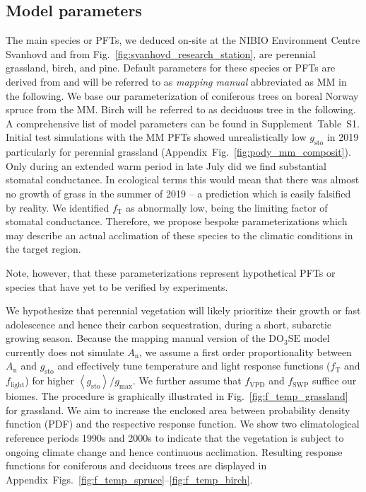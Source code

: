 \documentclass[bg, manuscript]{copernicus}
\begin{document}
\subsection{Model parameters}
\label{subsec:do3se_parameters}

The main species or PFTs, we deduced on-site at the NIBIO Environment Centre Svanhovd and from Fig.~\ref{fig:svanhovd_research_station}, are perennial grassland, birch, and pine. Default parameters for these species or PFTs are derived from \citet{EP:Simpson2007,GCB:Mills2011,ICP:MappingManual2017} and will be referred to as \emph{mapping manual} abbreviated as MM in the following. We base our parameterization of coniferous trees on boreal Norway spruce from the MM. Birch will be referred to as deciduous tree in the following. A comprehensive list of model parameters can be found in Supplement~Table~S1.
Initial test simulations with the MM PFTs showed unrealistically low $g_\mathrm{sto}$ in 2019 particularly for perennial grassland (Appendix~Fig.~\ref{fig:pody_mm_composit}). Only during an extended warm period in late July did we find substantial stomatal conductance. In ecological terms this would mean that there was almost no growth of grass in the summer of 2019 -- a prediction which is easily falsified by reality. We identified $f_\mathrm{T}$ as abnormally low, being the limiting factor of stomatal conductance. Therefore, we propose bespoke parameterizations which may describe an actual acclimation of these species to the climatic conditions in the target region.

Note, however, that these parameterizations represent hypothetical PFTs or species that have yet to be verified by experiments. 

We hypothesize that perennial vegetation will likely prioritize their growth or fast adolescence and hence their carbon sequestration, during a short, subarctic growing season. Because the mapping manual version of the $\mathrm{DO_3SE}$ model currently does not simulate $A_\mathrm{n}$, we assume a first order proportionality between $A_\mathrm{n}$ and $g_\mathrm{sto}$ \citep{GCB:Medlyn2011} and effectively tune temperature and light response functions ($f_\mathrm{T}$ and $f_\mathrm{light}$) for higher $\left<g_\mathrm{sto}\right>/g_\mathrm{max}$. We further assume that $f_\mathrm{VPD}$ and $f_\mathrm{SWP}$ suffice our biomes. The procedure is graphically illustrated in Fig.~\ref{fig:f_temp_grassland} for grassland. We aim to increase the enclosed area between probability density function (PDF) and the respective response function. We show two climatological reference periods 1990s and 2000s to indicate that the vegetation is subject to ongoing climate change and hence continuous acclimation. Resulting response functions for coniferous and deciduous trees are displayed in Appendix~Figs.~\ref{fig:f_temp_spruce}--\ref{fig:f_temp_birch}. 
\end{document}
